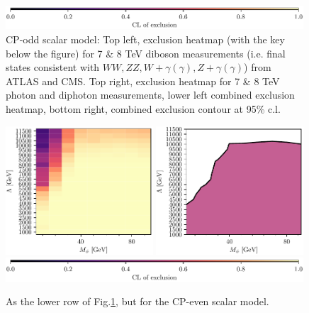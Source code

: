 \documentclass[11pt]{cernrep}
\begin{document}
\begin{figure}
\begin{center}
\includegraphics[width=0.99\textwidth]{colorbarkey.pdf}
    \caption{CP-odd scalar model: Top left, exclusion heatmap (with the key below the figure) for 
7 \& 8 TeV diboson measurements (i.e. final states consistent with $WW, ZZ, W+\gamma(\gamma), Z+\gamma(\gamma)$) 
from ATLAS and CMS. Top right, exclusion heatmap for 7 \& 8 TeV photon and diphoton measurements, lower left combined 
exclusion heatmap, bottom right, combined exclusion contour at 95\% c.l.}
\label{fig:cpomaps}
\end{center}
\end{figure}

\begin{figure}
\begin{center}
\includegraphics[width=0.49\textwidth]{cpe-map.pdf}
\includegraphics[width=0.49\textwidth]{cpe-contour.pdf}\\
\includegraphics[width=0.99\textwidth]{colorbarkey.pdf}
    \caption{As the lower row of Fig.\protect\ref{fig:cpomaps}, but for the CP-even scalar model.}
\label{fig:cpemaps}
\end{center}
\end{figure}
\end{document}
